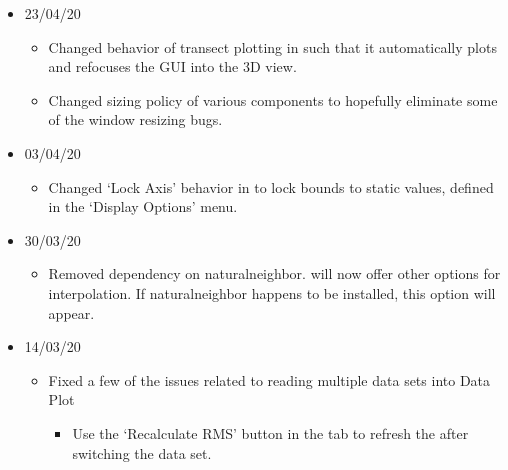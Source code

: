 \documentclass[letterpaper,10pt,english]{sphinxmanual}
\begin{document}
\begin{itemize}
\begin{itemize}
\begin{itemize}
\end{itemize}

\end{itemize}

\item {} 
23/04/20
\begin{itemize}
\item {} 
Changed behavior of transect plotting in {\hyperref[\detokenize{content/model_viewer/main_window:model-viewer}]{}} such that it automatically plots and refocuses the GUI into the 3D view.

\item {} 
Changed sizing policy of various {\hyperref[\detokenize{content/model_viewer/main_window:model-viewer}]{}} components to hopefully eliminate some of the window resizing bugs.

\end{itemize}

\item {} 
03/04/20
\begin{itemize}
\item {} 
Changed ‘Lock Axis’ behavior in {\hyperref[\detokenize{content/data_plot/main_window:data-plot}]{}} to lock bounds to static values, defined in the ‘Display Options’ menu.

\end{itemize}

\item {} 
30/03/20
\begin{itemize}
\item {} 
Removed dependency on naturalneighbor. {\hyperref[\detokenize{content/data_plot/main_window:data-plot}]{}} will now offer other options for interpolation. If naturalneighbor happens to be installed, this option will appear.

\end{itemize}

\item {} 
14/03/20
\begin{itemize}
\item {} 
Fixed a few of the issues related to reading multiple data sets into Data Plot
\begin{itemize}
\item {} 
Use the ‘Recalculate RMS’ button in the  tab to refresh the {\hyperref[\detokenize{content/data_plot/main_window:misfit-table}]{}} after switching the data set.


\end{itemize}
\end{itemize}
\end{itemize}
\end{document}
